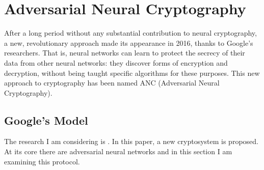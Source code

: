 \documentclass[%
    corpo=11pt,
    twoside,
    stile=classica,
    oldstyle,
    autoretitolo,
    tipotesi=magistrale,
    greek,
    evenboxes,
    english
]{toptesi}
\begin{document}
\chapter{Adversarial Neural Cryptography}
After a long period without any substantial contribution to neural cryptography, a new, revolutionary approach made its appearance in 2016, thanks to Google's researchers. That is, neural networks can learn to protect the secrecy of their data from other neural networks: they discover forms of encryption and decryption, without being taught specific algorithms for these purposes. This new approach to cryptography has been named ANC (Adversarial Neural Cryptography).

\section{Google's Model}
The research I am considering is \cite{google}. In this paper, a new cryptosystem is proposed. At its core there are adversarial neural networks and in this section I am examining this protocol.
\end{document}
